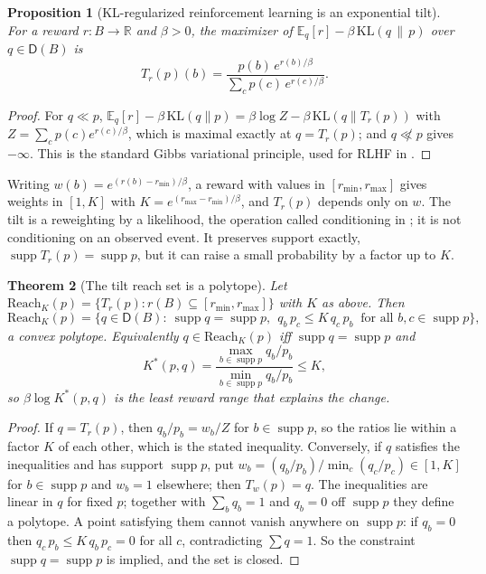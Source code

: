 \documentclass[11pt]{article}
\newtheorem{theorem}{Theorem}[section]
\newtheorem{proposition}[theorem]{Proposition}
\theoremstyle{definition}
\theoremstyle{remark}
\newcommand{\D}{\mathsf{D}}
\newcommand{\Reach}{\mathrm{Reach}}
\newcommand{\supp}{\operatorname{supp}}
\begin{document}
\begin{proposition}[KL-regularized reinforcement learning is an exponential tilt]\label{prop:gibbs}
For a reward $r\colon B\to\mathbb{R}$ and $\beta>0$, the maximizer of
$\mathbb{E}_q[r]-\beta\,\mathrm{KL}(q\,\|\,p)$ over $q\in\D(B)$ is
\[
T_r(p)(b)=\frac{p(b)\,e^{r(b)/\beta}}{\sum_cp(c)\,e^{r(c)/\beta}} .
\]
\end{proposition}
\begin{proof}
For $q\ll p$, $\mathbb{E}_q[r]-\beta\,\mathrm{KL}(q\|p)=\beta\log Z-\beta\,\mathrm{KL}(q\|T_r(p))$ with
$Z=\sum_cp(c)e^{r(c)/\beta}$, which is maximal exactly at $q=T_r(p)$; and $q\not\ll p$ gives
$-\infty$. This is the standard Gibbs variational principle, used for RLHF in
\cite{Korbak2022,Rafailov2023}.
\end{proof}

Writing $w(b)=e^{(r(b)-r_{\min})/\beta}$, a reward with values in $[r_{\min},r_{\max}]$ gives weights
in $[1,K]$ with $K=e^{(r_{\max}-r_{\min})/\beta}$, and $T_r(p)$ depends only on $w$. The tilt is a
reweighting by a likelihood, the operation called conditioning in \cite[\S4]{Awasthi-Tower}; it is not
conditioning on an observed event. It preserves support exactly, $\supp T_r(p)=\supp p$, but it can
raise a small probability by a factor up to $K$.

\begin{theorem}[The tilt reach set is a polytope]\label{thm:tilt-polytope}
Let $\Reach_K(p)=\{T_r(p):r(B)\subseteq[r_{\min},r_{\max}]\}$ with $K$ as above. Then
\[
\Reach_K(p)=\big\{q\in\D(B):\ \supp q=\supp p,\ \ q_b\,p_c\le K\,q_c\,p_b\ \text{ for all }b,c\in\supp p\big\},
\]
a convex polytope. Equivalently $q\in\Reach_K(p)$ iff $\supp q=\supp p$ and
\[
K^*(p,q)=\frac{\max_{b\in\supp p}q_b/p_b}{\min_{b\in\supp p}q_b/p_b}\le K,
\]
so $\beta\log K^*(p,q)$ is the least reward range that explains the change.
\end{theorem}
\begin{proof}
If $q=T_r(p)$, then $q_b/p_b=w_b/Z$ for $b\in\supp p$, so the ratios lie within a factor $K$ of each
other, which is the stated inequality. Conversely, if $q$ satisfies the inequalities and has support
$\supp p$, put $w_b=(q_b/p_b)/\min_c(q_c/p_c)\in[1,K]$ for $b\in\supp p$ and $w_b=1$ elsewhere; then
$T_w(p)=q$. The inequalities are linear in $q$ for fixed $p$; together with $\sum_bq_b=1$ and $q_b=0$
off $\supp p$ they define a polytope. A point satisfying them cannot vanish anywhere on $\supp p$:
if $q_b=0$ then $q_c\,p_b\le K\,q_b\,p_c=0$ for all $c$, contradicting $\sum q=1$. So the constraint
$\supp q=\supp p$ is implied, and the set is closed.
\end{proof}
\end{document}
